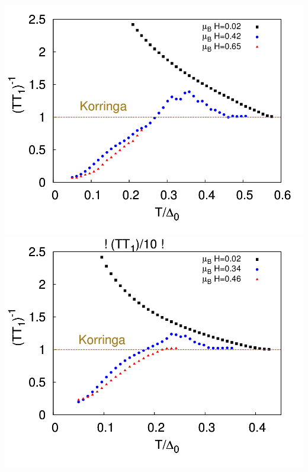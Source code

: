 \documentclass[amssymb,amsmath]{beamer}
\begin{document}
\begin{frame}
\begin{columns}
\begin{column}{0.7\textwidth}
\includegraphics[scale=0.11]{./figures_3/fig_5/Fig5S_2.png} 
\includegraphics[scale=0.11]{./figures_3/fig_5/Fig5D_2.png}
\end{column}
\end{columns}
\end{frame}

\end{document}
